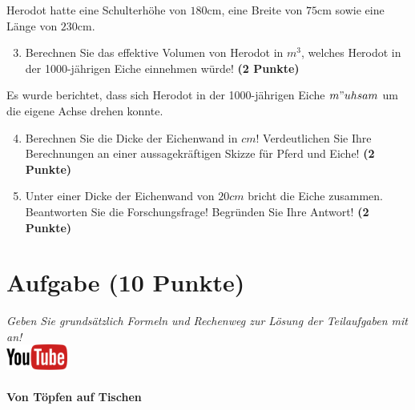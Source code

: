 \documentclass[a4paper, 9pt]{scrartcl}\usepackage[]{graphicx}\usepackage[]{xcolor}
\begin{document}
Herodot hatte eine Schulterh{\"o}he von $180$cm, eine Breite von
$75$cm sowie eine L{\"a}nge von  $230$cm.

\begin{enumerate}
  \setcounter{enumi}{2}
\item Berechnen Sie das effektive Volumen von Herodot in $m^3$, welches
  Herodot in der 1000-j{\"a}hrigen Eiche einnehmen w{\"u}rde! \textbf{(2 Punkte)}
\end{enumerate}

Es wurde berichtet, dass sich Herodot in der 1000-j{\"a}hrigen Eiche
$m{"u}hsam$ um die eigene Achse drehen konnte.

\begin{enumerate}
  \setcounter{enumi}{3}
\item Berechnen Sie die Dicke der Eichenwand in $cm$! Verdeutlichen Sie Ihre
  Berechnungen an einer aussagekr{\"a}ftigen Skizze f{\"u}r Pferd und Eiche! \textbf{(2 Punkte)} 
\item Unter einer Dicke der Eichenwand von $20cm$ bricht
  die Eiche zusammen. Beantworten Sie die Forschungsfrage! Begr{\"u}nden Sie
  Ihre Antwort! \textbf{(2 Punkte)} 
\end{enumerate}
 
\clearpage

\section{Aufgabe \hfill (10 Punkte)}

\textit{Geben Sie grunds{\"a}tzlich Formeln und Rechenweg zur L{\"o}sung der
  Teilaufgaben mit an!} \\[1Ex]

\hfill\href{https://youtu.be/57B-yYoFSk0}{\includegraphics[width =
  2cm]{img/youtube}} %
\hspace{2Ex}

\paragraph{Von T{\"o}pfen auf Tischen}
\end{document}
